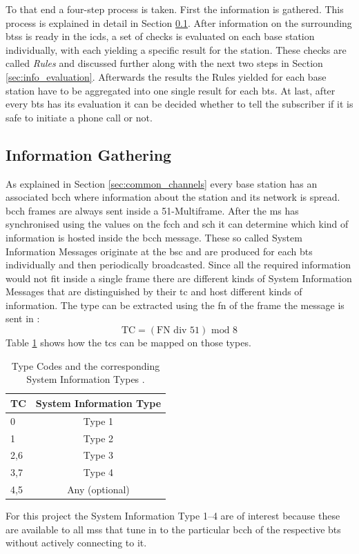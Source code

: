 To that end a four-step process is taken.
First the information is gathered.
This process is explained in detail in Section \ref{sec:info_gathering}.
After information on the surrounding \glspl{bts} is ready in the \gls{icds}, a set of checks is evaluated on each base station individually, with each yielding a specific result for the station.
These checks are called \emph{Rules} and discussed further along with the next two steps in Section \ref{sec:info_evaluation}.
Afterwards the results the Rules yielded for each base station have to be aggregated into one single result for each \gls{bts}.
At last, after every \gls{bts} has its evaluation it can be decided whether to tell the subscriber if it is safe to initiate a phone call or not.

\subsection{Information Gathering}
\label{sec:info_gathering}
As explained in Section \ref{sec:common_channels} every base station has an associated \gls{bcch} where information about the station and its network is spread.
\gls{bcch} frames are always sent inside a 51-Multiframe.
After the \gls{ms} has synchronised using the values on the \gls{fcch} and \gls{sch} it can determine which kind of information is hosted inside the \gls{bcch} message.
These so called System Information Messages originate at the \gls{bsc} and are produced for each \gls{bts} individually and then periodically broadcasted.
Since all the required information would not fit inside a single frame there are different kinds of System Information Messages that are distinguished by their \gls{tc} and host different kinds of information.
The type can be extracted using the \gls{fn} of the frame the message is sent in \cite{GSM2009}:
\[\text{TC}=(\text{FN} \text{ div } 51)\text{ mod } 8\]
Table \ref{tab:tc_mapping} shows how the \glspl{tc} can be mapped on those types.
\begin{table}
\centering
\begin{tabular}{lc}
\toprule
TC		&System Information Type\\
\midrule
0		&Type 1\\
1		&Type 2\\
2,6		&Type 3\\
3,7		&Type 4\\
4,5		&Any (optional)\\
\bottomrule
\end{tabular}
\caption{Type Codes and the corresponding System Information Types \cite{GSM2009}.}
\label{tab:tc_mapping}
\end{table}
For this project the System Information Type 1--4 are of interest because these are available to all \glspl{ms} that tune in to the particular \gls{bcch} of the respective \gls{bts} without actively connecting to it.

